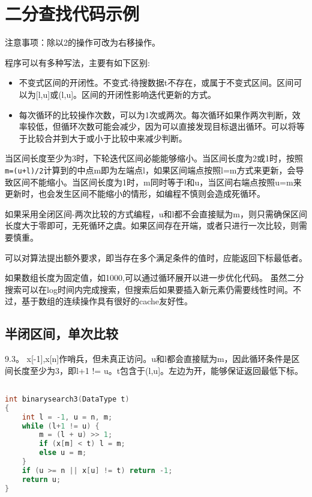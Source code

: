 \section{二分查找代码示例}

注意事项：除以2的操作可改为右移操作。

程序可以有多种写法，主要有如下区别:
\begin{itemize}
    \item 不变式区间的开闭性。不变式:待搜数据t不存在，或属于不变式区间。区间可以为[l,u]或(l,u]。区间的开闭性影响迭代更新的方式。
    \item 每次循环的比较操作次数，可以为1次或两次。每次循环如果作两次判断，效率较低，但循环次数可能会减少，因为可以直接发现目标退出循环。可以将等于比较合并到大于或小于比较中来减少判断。
\end{itemize}


当区间长度至少为3时，下轮迭代区间必能能够缩小。当区间长度为2或1时，按照\verb|m=(u+l)/2|计算到的中点m即为左端点l，如果区间端点按照l=m方式来更新，会导致区间不能缩小。当区间长度为1时，m同时等于l和u，当区间右端点按照u=m来更新时，也会发生区间不能缩小的情形，如编程不慎则会造成死循环。

如果采用全闭区间-两次比较的方式编程，u和l都不会直接赋为m，则只需确保区间长度大于零即可，无死循环之虞。如果区间存在开端，或者只进行一次比较，则需要慎重。

可以对算法提出额外要求，即当存在多个满足条件的值时，应能返回下标最低者。

如果数组长度为固定值，如1000,可以通过循环展开以进一步优化代码。
虽然二分搜索可以在log时间内完成搜索，但搜索后如果要插入新元素仍需要线性时间。不过，基于数组的连续操作具有很好的cache友好性。

\subsection{半闭区间，单次比较}
\cite{pp}9.3。 x[-1],x[n]作哨兵，但未真正访问。u和l都会直接赋为m，因此循环条件是区间长度至少为3，即l+1 != u。t包含于(l,u]。左边为开，能够保证返回最低下标。
\label{codes:binsort}

\begin{lstlisting}[language=C]

int binarysearch3(DataType t)
{	
	int l = -1, u = n, m;
	while (l+1 != u) {
		m = (l + u) >> 1;
		if (x[m] < t) l = m;
		else u = m;
	}
	if (u >= n || x[u] != t) return -1;
	return u;
}
\end{lstlisting}


